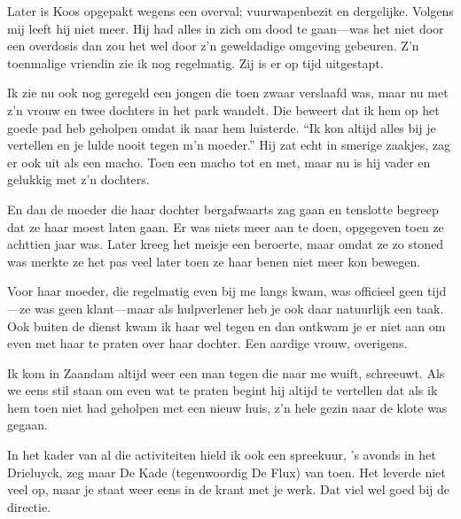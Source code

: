 \documentclass[12pt,twoside, openright]{memoir}
\begin{document}
Later is Koos opgepakt wegens een overval; vuurwapenbezit en dergelijke. Volgens mij leeft hij niet meer. Hij had alles in zich om dood te gaan---was het niet door een overdosis dan zou het wel door z’n geweldadige omgeving gebeuren. Z’n toenmalige vriendin zie ik nog regelmatig. Zij is er op tijd uitgestapt.

Ik zie nu ook nog geregeld een jongen die toen zwaar verslaafd was, maar nu met z’n vrouw en twee dochters in het park wandelt. Die beweert dat ik hem op het goede pad heb geholpen omdat ik naar hem luisterde. ``Ik kon altijd alles bij je vertellen en je lulde nooit tegen m’n moeder.'' Hij zat echt in smerige zaakjes, zag er ook uit als een macho. Toen een macho tot en met, maar nu is hij vader en gelukkig met z’n dochters. 

En dan de moeder die haar dochter bergafwaarts zag gaan en tenslotte begreep dat ze haar moest laten gaan. Er was niets meer aan te doen, opgegeven toen ze achttien jaar was. Later kreeg het meisje een beroerte, maar omdat ze zo stoned was merkte ze het pas veel later toen ze haar benen niet meer kon bewegen. 

Voor haar moeder, die regelmatig even bij me langs kwam, was officieel geen tijd---ze was geen klant---maar als hulpverlener heb je ook daar natuurlijk een taak. Ook buiten de dienst kwam ik haar wel tegen en dan ontkwam je er niet aan om even met haar te praten over haar dochter. Een aardige vrouw, overigens.

Ik kom in Zaandam altijd weer een man tegen die naar me wuift, schreeuwt. Als we eens stil staan om even wat te praten begint hij altijd te vertellen dat als ik hem toen niet had geholpen met een nieuw huis, z’n hele gezin naar de klote was gegaan.

In het kader van al die activiteiten hield ik ook een spreekuur, 's avonds in het Drieluyck, zeg maar De Kade (tegenwoordig De Flux) van toen. Het leverde niet veel op, maar je staat weer eens in de krant met je werk. Dat viel wel goed bij de directie. 
\end{document}
